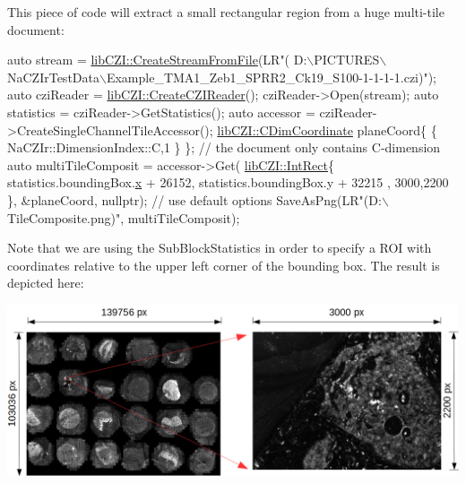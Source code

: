 This piece of code will extract a small rectangular region from a huge multi-\/tile document\+:


\begin{DoxyCode}
\textcolor{keyword}{auto} stream = \hyperlink{namespacelib_c_z_i_a8783cf40c0eac418632db90c4f20b43b}{libCZI::CreateStreamFromFile}(LR\textcolor{stringliteral}{"(
      D:\(\backslash\)PICTURES\(\backslash\)NaCZIrTestData\(\backslash\)Example\_TMA1\_Zeb1\_SPRR2\_Ck19\_S100-1-1-1-1.czi)");}
\textcolor{stringliteral}{}\textcolor{keyword}{auto} cziReader = \hyperlink{namespacelib_c_z_i_abe978d8bd50abe94c2d37df6212859e8}{libCZI::CreateCZIReader}();
cziReader->Open(stream);
\textcolor{keyword}{auto} statistics = cziReader->GetStatistics();
\textcolor{keyword}{auto} accessor = cziReader->CreateSingleChannelTileAccessor();
\hyperlink{classlib_c_z_i_1_1_c_dim_coordinate}{libCZI::CDimCoordinate} planeCoord\{ \{ NaCZIr::DimensionIndex::C,1 \} \};   \textcolor{comment}{// the
       document only contains C-dimension}
\textcolor{keyword}{auto} multiTileComposit = accessor->Get(
    \hyperlink{structlib_c_z_i_1_1_int_rect}{libCZI::IntRect}\{ statistics.boundingBox.\hyperlink{structlib_c_z_i_1_1_int_rect_a7a1e25fc9f6a4c99d9a3710446b7a5de}{x} + 26152, statistics.boundingBox.y + 32215 ,
      3000,2200 \},
    &planeCoord,
    \textcolor{keyword}{nullptr});   \textcolor{comment}{// use default options}
SaveAsPng(LR\textcolor{stringliteral}{"(D:\(\backslash\)TileComposite.png)", multiTileComposit);}
\end{DoxyCode}


Note that we are using the {\ttfamily Sub\+Block\+Statistics} in order to specify a R\+OI with coordinates relative to the upper left corner of the bounding box. The result is depicted here\+:


\begin{DoxyImage}
\includegraphics[width=\textwidth,height=\textheight/2,keepaspectratio=true]{SingleChannelTileAccessor_3.PNG}
\end{DoxyImage}


